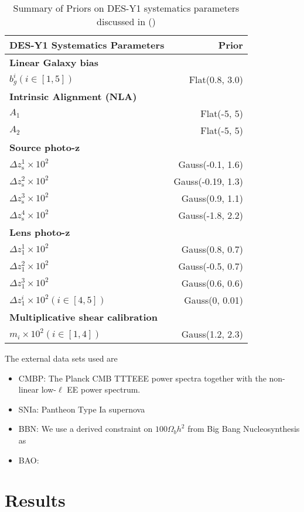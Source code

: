 \begin{table}
\centering
\begin{tabular}{lr}  
\hline
DES-Y1 Systematics Parameters &  Prior \\
\hline
\hline
\textbf{Linear Galaxy bias} \\
$ b_g^i(i \in [1,5])$ &  Flat(0.8, 3.0) \\
\hline
\textbf{Intrinsic Alignment (NLA)} \\
$A_{1}$ &  Flat(-5, 5) \\
$A_{2}$ &  Flat(-5, 5) \\
\hline
\textbf{Source photo-z} \\
$\Delta z_{\mathrm{s}}^{1} \times 10^{2}$ & Gauss(-0.1, 1.6) \\
$\Delta z_{\mathrm{s}}^{2} \times 10^{2}$ & Gauss(-0.19, 1.3) \\
$\Delta z_{\mathrm{s}}^{3} \times 10^{2}$ & Gauss(0.9, 1.1)\\
$\Delta z_{\mathrm{s}}^{4} \times 10^{2}$ & Gauss(-1.8, 2.2)\\
\hline
\textbf{Lens photo-z}\\
$\Delta z_{\mathrm{1}}^{1} \times 10^{2}$ & Gauss(0.8, 0.7) \\
$\Delta z_{\mathrm{1}}^{2} \times 10^{2}$ & Gauss(-0.5, 0.7)  \\
$\Delta z_{\mathrm{1}}^{3} \times 10^{2}$ & Gauss(0.6, 0.6)\\
$\Delta z_{\mathrm{1}}^{i} \times 10^{2} (i \in [4,5]) $ &   Gauss(0, 0.01)\\
\hline
\textbf{Multiplicative shear calibration} \\
$m_{i} \times 10^2 (i \in [1,4])$ &   Gauss(1.2, 2.3)\\
\hline
\end{tabular}
\caption{Summary of Priors on DES-Y1 systematics parameters discussed in ()}
\label{table:prior_choices_Y1}
\end{table}
The external data sets used are
\begin{itemize}
	\item CMBP: The Planck CMB TTTEEE power spectra together with the non-linear low-$\ell$ EE power spectrum.
	\item SNIa: Pantheon Type Ia supernova
	\item BBN: We use a derived constraint on $100\Omega_bh^2$ from Big Bang Nucleosynthesis as
	\item BAO: 
\end{itemize}

\section{Results}
